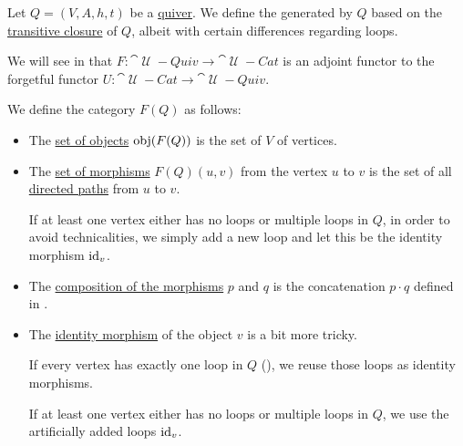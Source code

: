 \begin{definition}\label{def:quiver_free_category}
  Let \( Q = (V, A, h, t) \) be a \hyperref[def:quiver]{quiver}. We define the  generated by \( Q \) based on the \hyperref[def:quiver_transitive_closure]{transitive closure} of \( Q \), albeit with certain differences regarding loops.

  We will see in  that \( F: \cat{\mscrU-Quiv} \to \cat{\mscrU-Cat} \) is an adjoint functor to the forgetful functor \( U: \cat{\mscrU-Cat} \to \cat{\mscrU-Quiv} \).

  We define the category \( F(Q) \) as follows:
  \begin{itemize}
    \item The \hyperref[def:category/objects]{set of objects} \( \operatorname{obj}(F(Q)) \) is the set of \( V \) of vertices.

    \item The \hyperref[def:category/morphisms]{set of morphisms} \( F(Q)(u, v) \) from the vertex \( u \) to \( v \) is the set of all \hyperref[def:quiver_path/directed]{directed paths} from \( u \) to \( v \).

    If at least one vertex either has no loops or multiple loops in \( Q \), in order to avoid technicalities, we simply add a new loop and let this be the identity morphism \( \operatorname{id}_v \).

    \item The \hyperref[def:category/composition]{composition of the morphisms} \( p \) and \( q \) is the concatenation \( p \cdot q \) defined in .

    \item The \hyperref[def:category/identity]{identity morphism} of the object \( v \) is a bit more tricky.

    If every vertex has exactly one loop in \( Q \) (), we reuse those loops as identity morphisms.

    If at least one vertex either has no loops or multiple loops in \( Q \), we use the artificially added loops \( \operatorname{id}_v \).
  \end{itemize}
\end{definition}
